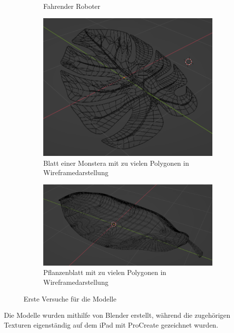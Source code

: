 \begin{figure}[H]
\begin{subfigure}{0.4\textwidth}
		\caption{Fahrender Roboter}
	\end{subfigure}
	\begin{subfigure}{0.4\textwidth}
		\centering
		\includegraphics[height=0.3\pageheight,keepaspectratio]{pics/8}
		\caption{Blatt einer Monstera mit zu vielen Polygonen in Wireframedarstellung}
	\end{subfigure}
	\begin{subfigure}{0.4\textwidth}
		\centering
		\includegraphics[height=0.3\pageheight,keepaspectratio]{pics/9}
		\caption{Pflanzenblatt mit zu vielen Polygonen in Wireframedarstellung}
	\end{subfigure}
	\caption{Erste Versuche für die Modelle}
\end{figure}

Die Modelle wurden mithilfe von Blender erstellt, während die zugehörigen Texturen eigenständig auf dem iPad mit ProCreate gezeichnet wurden.

